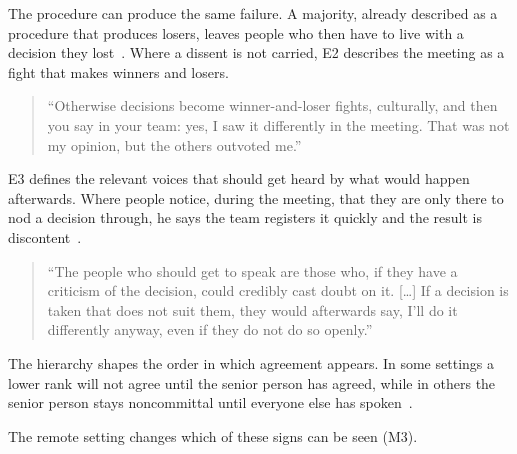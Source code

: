The procedure can produce the same failure.
A majority, already described as a procedure that produces losers, leaves people who then
have to live with a decision they lost~.
Where a dissent is not carried, E2 describes the meeting as a fight that makes winners and
losers.
{\setlength{\topsep}{0.25\baselineskip}\setlength{\partopsep}{0pt}%
  \begin{quote}\small
    \enquote{Otherwise decisions become winner-and-loser fights, culturally, and then you say
      in your team: yes, I saw it differently in the meeting. That was not my opinion, but the
    others outvoted me.}~
\end{quote}}

E3 defines the relevant voices that should get heard by what would happen afterwards.
Where people notice, during the meeting, that they are only there to nod a decision through,
he says the team registers it quickly and the result is discontent~.
{\setlength{\topsep}{0.25\baselineskip}\setlength{\partopsep}{0pt}%
  \begin{quote}\small
    \enquote{The people who should get to speak are those who, if they have a criticism of the
      decision, could credibly cast doubt on it. [\ldots] If a decision is taken that does not
      suit them, they would afterwards say, I'll do it differently anyway, even if they do not
    do so openly.}~
\end{quote}}
The hierarchy shapes the order in which agreement appears.
In some settings a lower rank will not agree until the senior person has agreed, while in
others the senior person stays noncommittal until everyone else has spoken~.

The remote setting changes which of these signs can be seen (M3).

